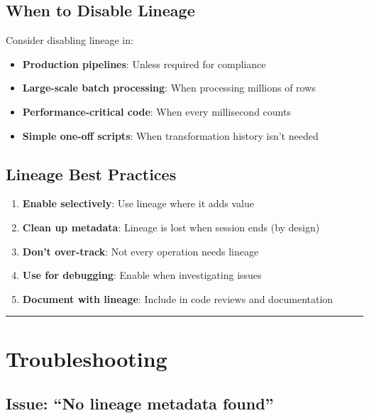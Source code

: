 \documentclass[
  letterpaper,
]{scrbook}
\providecommand{\tightlist}{%
  \setlength{\itemsep}{0pt}\setlength{\parskip}{0pt}}
\begin{document}
\subsection{When to Disable Lineage}\label{when-to-disable-lineage}

Consider disabling lineage in:

\begin{itemize}
\tightlist
\item
  \textbf{Production pipelines}: Unless required for compliance
\item
  \textbf{Large-scale batch processing}: When processing millions of
  rows
\item
  \textbf{Performance-critical code}: When every millisecond counts
\item
  \textbf{Simple one-off scripts}: When transformation history isn't
  needed
\end{itemize}

\subsection{Lineage Best Practices}\label{lineage-best-practices}

\begin{enumerate}
\def\labelenumi{\arabic{enumi}.}
\tightlist
\item
  \textbf{Enable selectively}: Use lineage where it adds value
\item
  \textbf{Clean up metadata}: Lineage is lost when session ends (by
  design)
\item
  \textbf{Don't over-track}: Not every operation needs lineage
\item
  \textbf{Use for debugging}: Enable when investigating issues
\item
  \textbf{Document with lineage}: Include in code reviews and
  documentation
\end{enumerate}

\begin{center}\rule{0.5\linewidth}{0.5pt}\end{center}

\section{Troubleshooting}\label{troubleshooting-1}

\subsection{Issue: ``No lineage metadata
found''}\label{issue-no-lineage-metadata-found}
\end{document}
